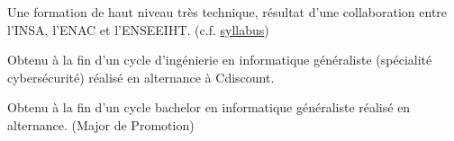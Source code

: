 \documentclass[10pt,a4paper,ragged2e,withhyper]{altacv}
\begin{document}
\begin{paracol}{2}
  \divider\smallskip



  \divider

  \divider

  \divider

\medskip


  Une formation de haut niveau très technique, résultat d'une collaboration entre
  l'INSA, l'ENAC et l'ENSEEIHT. (c.f. \href{https://tls-sec.github.io/documents/Syllabus_Ms_securite_Informatique_V1.pdf}{syllabus})

  \divider

  Obtenu à la fin d'un cycle d'ingénierie en informatique généraliste (spécialité
  cybersécurité) réalisé en alternance à Cdiscount.

  \divider

  Obtenu à la fin d'un cycle bachelor en informatique généraliste réalisé en
  alternance.
  (Major de Promotion)

  \divider



\end{paracol}
\end{document}
